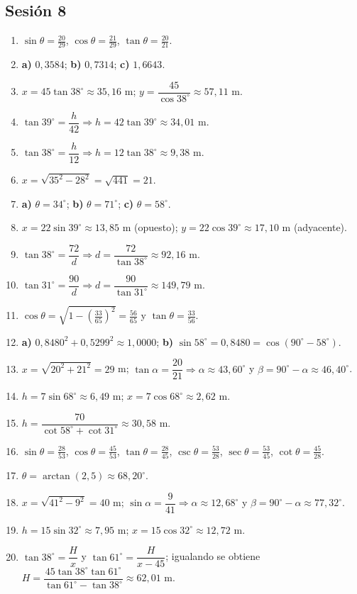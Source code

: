 \documentclass[12pt, letterpaper]{article}
\providecommand{\sen}{\sin}
\begin{document}
\subsection*{Sesión 8}
\begin{enumerate}[leftmargin=*, label=\textbf{\arabic*.}]
  \item $\sen\theta=\frac{20}{29}$, $\cos\theta=\frac{21}{29}$, $\tan\theta=\frac{20}{21}$.
  \item \textbf{a)} $0{,}3584$; \quad \textbf{b)} $0{,}7314$; \quad \textbf{c)} $1{,}6643$.
  \item $x=45\tan 38^{\circ}\approx 35{,}16$ m; $y=\dfrac{45}{\cos 38^{\circ}}\approx 57{,}11$ m.
  \item $\tan 39^{\circ}=\dfrac{h}{42}\Rightarrow h=42\tan 39^{\circ}\approx 34{,}01$ m.
  \item $\tan 38^{\circ}=\dfrac{h}{12}\Rightarrow h=12\tan 38^{\circ}\approx 9{,}38$ m.
  \item $x=\sqrt{35^2-28^2}=\sqrt{441}=21$.
  \item \textbf{a)} $\theta=34^{\circ}$; \quad \textbf{b)} $\theta=71^{\circ}$; \quad \textbf{c)} $\theta=58^{\circ}$.
  \item $x=22\sen 39^{\circ}\approx 13{,}85$ m (opuesto); $y=22\cos 39^{\circ}\approx 17{,}10$ m (adyacente).
  \item $\tan 38^{\circ}=\dfrac{72}{d}\Rightarrow d=\dfrac{72}{\tan 38^{\circ}}\approx 92{,}16$ m.
  \item $\tan 31^{\circ}=\dfrac{90}{d}\Rightarrow d=\dfrac{90}{\tan 31^{\circ}}\approx 149{,}79$ m.
  \item $\cos\theta=\sqrt{1-\left(\frac{33}{65}\right)^2}=\frac{56}{65}$ y $\tan\theta=\frac{33}{56}$.
  \item \textbf{a)} $0{,}8480^2+0{,}5299^2\approx 1{,}0000$; \quad \textbf{b)} $\sen 58^{\circ}=0{,}8480=\cos(90^{\circ}-58^{\circ})$. \checkmark
  \item $x=\sqrt{20^2+21^2}=29$ m; $\tan\alpha=\dfrac{20}{21}\Rightarrow\alpha\approx 43{,}60^{\circ}$ y $\beta=90^{\circ}-\alpha\approx 46{,}40^{\circ}$.
  \item $h=7\sen 68^{\circ}\approx 6{,}49$ m; $x=7\cos 68^{\circ}\approx 2{,}62$ m.
  \item $h=\dfrac{70}{\cot 58^{\circ}+\cot 31^{\circ}}\approx 30{,}58$ m.
  \item $\sen\theta=\frac{28}{53}$, $\cos\theta=\frac{45}{53}$, $\tan\theta=\frac{28}{45}$, $\csc\theta=\frac{53}{28}$, $\sec\theta=\frac{53}{45}$, $\cot\theta=\frac{45}{28}$.
  \item $\theta=\arctan\left(2{,}5\right)\approx 68{,}20^{\circ}$.
  \item $x=\sqrt{41^2-9^2}=40$ m; $\sen\alpha=\dfrac{9}{41}\Rightarrow\alpha\approx 12{,}68^{\circ}$ y $\beta=90^{\circ}-\alpha\approx 77{,}32^{\circ}$.
  \item $h=15\sen 32^{\circ}\approx 7{,}95$ m; $x=15\cos 32^{\circ}\approx 12{,}72$ m.
  \item $\tan 38^{\circ}=\dfrac{H}{x}$ y $\tan 61^{\circ}=\dfrac{H}{x-45}$; igualando se obtiene $H=\dfrac{45\tan 38^{\circ}\tan 61^{\circ}}{\tan 61^{\circ}-\tan 38^{\circ}}\approx 62{,}01$ m.
\end{enumerate}
\end{document}
